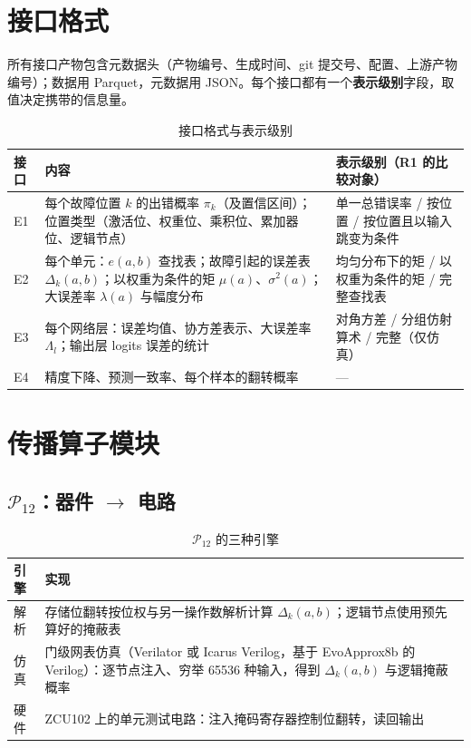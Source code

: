 \documentclass[11pt,a4paper]{ctexart}
\begin{document}
\section{接口格式}
\label{sec:interfaces}
所有接口产物包含元数据头（产物编号、生成时间、git 提交号、配置、上游产物编号）；数据用 Parquet，元数据用 JSON。每个接口都有一个\textbf{表示级别}字段，取值决定携带的信息量。

\begin{table}[h]
\centering
\small
\begin{tabularx}{\textwidth}{@{}lXX@{}}
\toprule
接口 & 内容 & 表示级别（R1 的比较对象） \\
\midrule
E1 & 每个故障位置 $k$ 的出错概率 $\pi_k$（及置信区间）；位置类型（激活位、权重位、乘积位、累加器位、逻辑节点） & 单一总错误率 / 按位置 / 按位置且以输入跳变为条件 \\
E2 & 每个单元：$e(a,b)$ 查找表；故障引起的误差表 $\Delta_k(a,b)$；以权重为条件的矩 $\mu(a)$、$\sigma^2(a)$；大误差率 $\lambda(a)$ 与幅度分布 & 均匀分布下的矩 / 以权重为条件的矩 / 完整查找表 \\
E3 & 每个网络层：误差均值、协方差表示、大误差率 $\Lambda_l$；输出层 logits 误差的统计 & 对角方差 / 分组仿射算术 / 完整（仅仿真） \\
E4 & 精度下降、预测一致率、每个样本的翻转概率 & — \\
\bottomrule
\end{tabularx}
\caption{接口格式与表示级别}
\end{table}

\section{传播算子模块}

\subsection{$\mathcal P_{12}$：器件 $\to$ 电路}
\begin{table}[h]
\centering
\small
\begin{tabularx}{\textwidth}{@{}lX@{}}
\toprule
引擎 & 实现 \\
\midrule
解析 & 存储位翻转按位权与另一操作数解析计算 $\Delta_k(a,b)$；逻辑节点使用预先算好的掩蔽表 \\
仿真 & 门级网表仿真（Verilator 或 Icarus Verilog，基于 EvoApprox8b 的 Verilog）：逐节点注入、穷举 65536 种输入，得到 $\Delta_k(a,b)$ 与逻辑掩蔽概率 \\
硬件 & ZCU102 上的单元测试电路：注入掩码寄存器控制位翻转，读回输出 \\
\bottomrule
\end{tabularx}
\caption{$\mathcal P_{12}$ 的三种引擎}
\end{table}
\end{document}
